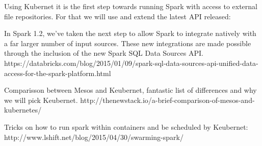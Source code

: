 Using Kubernet it is the first step towards running Spark with access to external file repositories.
For that we will use and extend the latest API released:

In Spark 1.2, we’ve taken the next step to allow Spark to integrate natively with a far larger number of input sources.  These new integrations are made possible through the inclusion of the new Spark SQL Data Sources API.
https://databricks.com/blog/2015/01/09/spark-sql-data-sources-api-unified-data-access-for-the-spark-platform.html

Comparisson between Mesos and Keubernet, fantastic list of differences and why we will pick Keubernet.
http://thenewstack.io/a-brief-comparison-of-mesos-and-kubernetes/


Tricks on how to run spark within containers and be scheduled by Keubernet:
http://www.lshift.net/blog/2015/04/30/swarming-spark/
